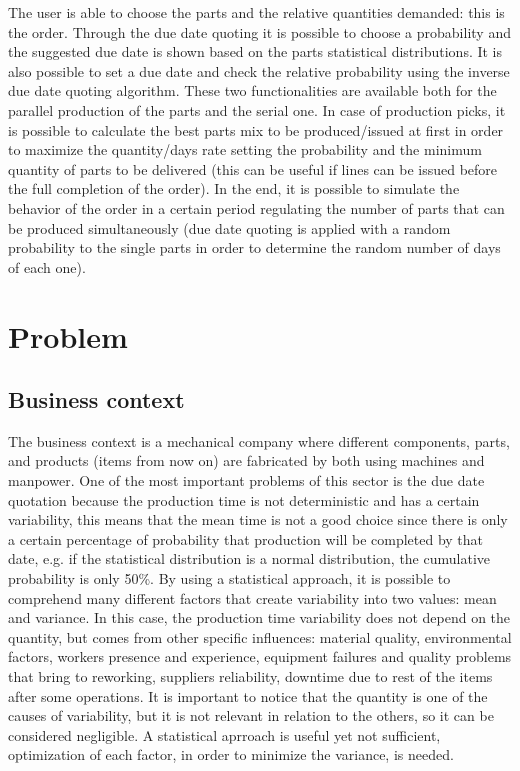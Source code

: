 \documentclass[a4paper,12pt]{article}
\begin{document}
The user is able to choose the parts and the relative quantities demanded: this is the order. Through the due date quoting it is possible to choose a probability and the suggested due date is shown based on the parts statistical distributions. It is also possible to set a due date and check the relative probability using the inverse due date quoting algorithm. These two functionalities are available both for the parallel production of the parts and the serial one. In case of production picks, it is possible to calculate the best parts mix to be produced/issued at first in order to maximize the quantity/days rate setting the probability and the minimum quantity of parts to be delivered (this can be useful if lines can be issued before the full completion of the order). In the end, it is possible to simulate the behavior of the order in a certain period regulating the number of parts that can be produced simultaneously (due date quoting is applied with a random probability to the single parts in order to determine the random number of days of each one).

\newpage
\section{Problem}
\subsection{Business context}
The business context is a mechanical company where different components, parts, and products (items from now on) are fabricated by both using machines and manpower. One of the most important problems of this sector is the due date quotation because the production time is not deterministic and has a certain variability, this means that the mean time is not a good choice since there is only a certain percentage of probability that production will be completed by that date, e.g. if the statistical distribution is a normal distribution,  the cumulative probability is only 50\%. By using a statistical approach, it is possible to comprehend many different factors that create variability into two values: mean and variance. In this case, the production time variability does not depend on the quantity, but comes from other specific influences: material quality, environmental factors, workers presence and experience, equipment failures and quality problems that bring to reworking, suppliers reliability, downtime due to rest of the items after some operations. It is important to notice that the quantity is one of the causes of variability, but it is not relevant in relation to the others, so it can be considered negligible. A statistical aprroach is useful yet not sufficient, optimization of each factor, in order to minimize the variance, is needed.\\
\end{document}

